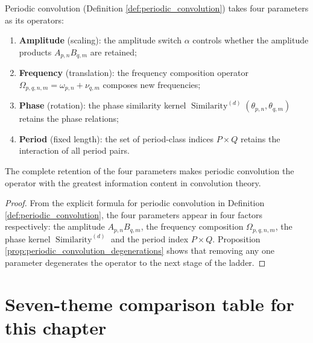 \begin{property}\label{prop:periodic_convolution_parametrization}
Periodic convolution (Definition \ref{def:periodic_convolution}) takes four parameters as its operators:
\begin{enumerate}[label=(\roman*)]
  \item \textbf{Amplitude} (scaling): the amplitude switch $\alpha$ controls whether the amplitude products $A_{p,n} B_{q,m}$ are retained;
  \item \textbf{Frequency} (translation): the frequency composition operator $\Omega_{p,q,n,m} = \omega_{p,n} + \nu_{q,m}$ composes new frequencies;
  \item \textbf{Phase} (rotation): the phase similarity kernel $\operatorname{Similarity}^{(d)}(\theta_{p,n}, \theta_{q,m})$ retains the phase relations;
  \item \textbf{Period} (fixed length): the set of period-class indices $P \times Q$ retains the interaction of all period pairs.
\end{enumerate}
The complete retention of the four parameters makes periodic convolution the operator with the greatest information content in convolution theory.
\end{property}

\begin{proof}
From the explicit formula for periodic convolution in Definition \ref{def:periodic_convolution}, the four parameters appear in four factors respectively: the amplitude $A_{p,n}B_{q,m}$, the frequency composition $\Omega_{p,q,n,m}$, the phase kernel $\operatorname{Similarity}^{(d)}$ and the period index $P \times Q$. Proposition \ref{prop:periodic_convolution_degenerations} shows that removing any one parameter degenerates the operator to the next stage of the ladder.
\end{proof}

\section*{Seven-theme comparison table for this chapter}

